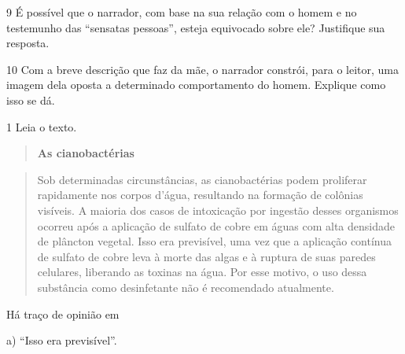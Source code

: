
\num{9} É possível que o narrador, com base na sua relação com o homem e
no testemunho das ``sensatas pessoas'', esteja equivocado sobre ele?
Justifique sua resposta.


\num{10} Com a breve descrição que faz da mãe, o narrador constrói, para
o leitor, uma imagem dela oposta a determinado comportamento do homem.
Explique como isso se dá.



\num{1} Leia o texto.

\begin{quote}
\textbf{As cianobactérias}
\end{quote}

\begin{quote}
Sob determinadas circunstâncias, as cianobactérias podem proliferar
rapidamente nos corpos d'água, resultando na formação de colônias
visíveis. A maioria dos casos de intoxicação por ingestão desses
organismos ocorreu após a aplicação de sulfato de cobre em águas com
alta densidade de plâncton vegetal. Isso era previsível, uma vez que a
aplicação contínua de sulfato de cobre leva à morte das algas e à
ruptura de suas paredes celulares, liberando as toxinas na água. Por
esse motivo, o uso dessa substância como desinfetante não é recomendado
atualmente.
\end{quote}


Há traço de opinião em

a) ``Isso era previsível''.

